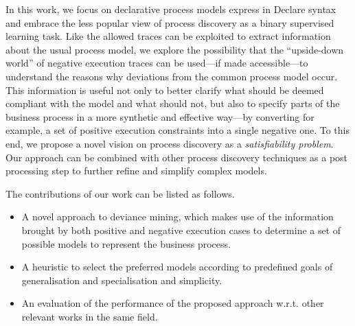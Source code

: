 In this work, we focus on declarative process models express in Declare syntax \cite{2008-Pesic} and embrace the less popular view of process discovery as a binary supervised learning task.
Like the allowed traces can be exploited to extract information about the usual process model, we explore the possibility that the ``upside-down world'' of negative execution traces can be used---if made accessible---to understand the reasons why deviations from the common process model occur. This information is useful not only to better clarify what should be deemed compliant with the model and what should not, but also to specify parts of the business process in a more synthetic and effective way---by converting for example, a set of positive execution constraints into a single negative one.  
To this end, we propose a novel vision on process discovery as a \emph{satisfiability problem}. Our approach can be combined with other process discovery techniques as a post processing step to further refine and simplify complex models.
 



The contributions of our work can be listed as follows.
\begin{itemize}
\item A novel approach to deviance mining, which makes use of the information brought by both positive and negative execution cases to determine a set of possible models to represent the business process.
\item A heuristic to select the preferred models according to predefined goals of generalisation and specialisation and simplicity.
\item An evaluation of the performance of the proposed approach w.r.t. other relevant works in the same field.
\end{itemize}


